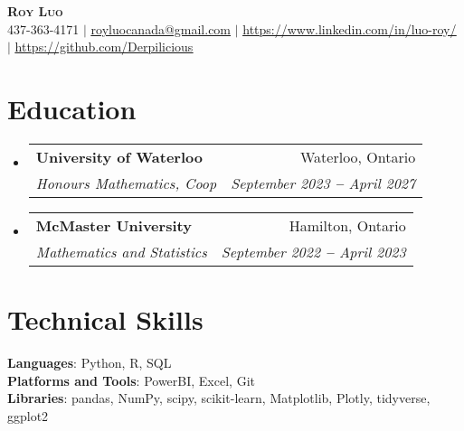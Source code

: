 \documentclass[letterpaper,11pt]{article}
\makeatletter
\newcommand{\resumeSubheading}[4]{
  \vspace{-2pt}\item
    \begin{tabular*}{0.97\textwidth}[t]{l@{\extracolsep{\fill}}r}
      \textbf{#1} & #2 \\
      \textit{\small#3} & \textit{\small #4} \\
    \end{tabular*}\vspace{-7pt}
}
\newcommand{\resumeSubHeadingListStart}{\begin{itemize}[leftmargin=0.15in, label={}]}
\newcommand{\resumeSubHeadingListEnd}{\end{itemize}}
\makeatother
\begin{document}

\begin{center}
    \textbf{\Huge \scshape Roy Luo} \\ \vspace{1pt}
    \small 437-363-4171 $|$ \href{mailto:royluocanada@gmail.com}{\underline{royluocanada@gmail.com}} $|$ 
    \href{https://linkedin.com/in/luo-roy/}{\underline{https://www.linkedin.com/in/luo-roy/}} $|$
    \href{https://github.com/Derpilicious}{\underline{https://github.com/Derpilicious}}
\end{center}
 
\section{Education}
  \resumeSubHeadingListStart
    \resumeSubheading
      {University of Waterloo}{Waterloo, Ontario}
      {Honours Mathematics, Coop}{September 2023 \textbf{--} April 2027}
    \resumeSubheading
      {McMaster University}{Hamilton, Ontario}
      {Mathematics and Statistics}{September 2022 \textbf{--} April 2023}
\resumeSubHeadingListEnd
      
\section{Technical Skills}
\begin{itemize}[leftmargin=0.15in, label={}]
   \small{\item{
    \textbf{Languages}{: Python, R, SQL} \\
    \textbf{Platforms and Tools}{: PowerBI, Excel, Git} \\
    \textbf{Libraries}{: pandas, NumPy, scipy, scikit-learn, Matplotlib, Plotly, tidyverse, ggplot2} \\
   }}
 \end{itemize}
\end{document}
